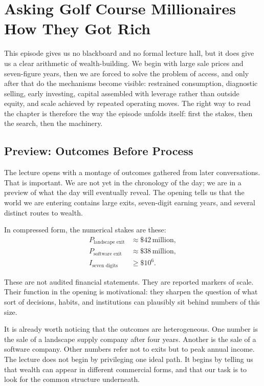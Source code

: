 \chapter{Asking Golf Course Millionaires How They Got Rich}

This episode gives us no blackboard and no formal lecture hall, but it does give us a clear arithmetic of wealth-building. We begin with large sale prices and seven-figure years, then we are forced to solve the problem of access, and only after that do the mechanisms become visible: restrained consumption, diagnostic selling, early investing, capital assembled with leverage rather than outside equity, and scale achieved by repeated operating moves. The right way to read the chapter is therefore the way the episode unfolds itself: first the stakes, then the search, then the machinery.

\section{Preview: Outcomes Before Process}

The lecture opens with a montage of outcomes gathered from later conversations. That is important. We are not yet in the chronology of the day; we are in a preview of what the day will eventually reveal. The opening tells us that the world we are entering contains large exits, seven-digit earning years, and several distinct routes to wealth.

In compressed form, the numerical stakes are these:
\begin{align}
P_{\text{landscape exit}} &\approx \$42\,\text{million},\\
P_{\text{software exit}} &\approx \$38\,\text{million},\\
I_{\text{seven digits}} &\ge \$10^6.
\end{align}

These are not audited financial statements. They are reported markers of scale. Their function in the opening is motivational: they sharpen the question of what sort of decisions, habits, and institutions can plausibly sit behind numbers of this size.

It is already worth noticing that the outcomes are heterogeneous. One number is the sale of a landscape supply company after four years. Another is the sale of a software company. Other numbers refer not to exits but to peak annual income. The lecture does not begin by privileging one ideal path. It begins by telling us that wealth can appear in different commercial forms, and that our task is to look for the common structure underneath.

